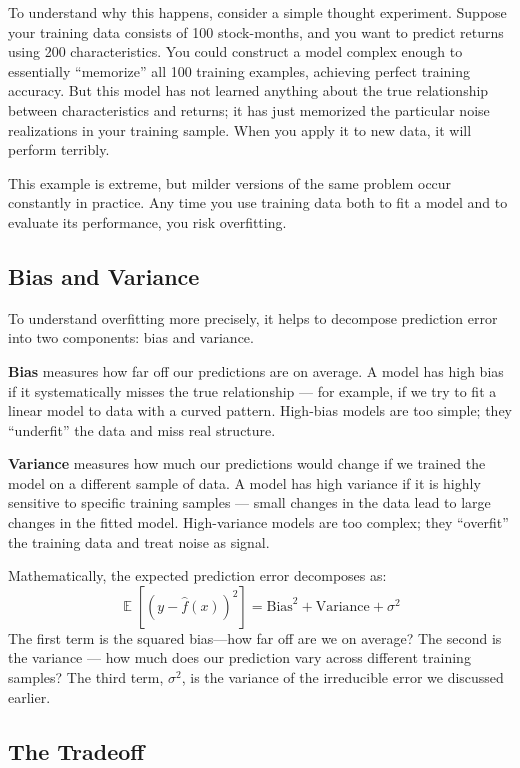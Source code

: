\documentclass[11pt,a4paper]{article}
\DeclareMathOperator{\E}{\mathbb{E}}
\newcommand{\keyword}[1]{\textbf{\textcolor{AccentOrange}{#1}}}
\begin{document}
To understand why this happens, consider a simple thought experiment. Suppose your training data consists of 100 stock-months, and you want to predict returns using 200 characteristics. You could construct a model complex enough to essentially ``memorize'' all 100 training examples, achieving perfect training accuracy. But this model has not learned anything about the true relationship between characteristics and returns; it has just memorized the particular noise realizations in your training sample. When you apply it to new data, it will perform terribly.

This example is extreme, but milder versions of the same problem occur constantly in practice. Any time you use training data both to fit a model and to evaluate its performance, you risk overfitting.

\subsection{Bias and Variance}

To understand overfitting more precisely, it helps to decompose prediction error into two components: bias and variance.

\keyword{Bias} measures how far off our predictions are on average. A model has high bias if it systematically misses the true relationship — for example, if we try to fit a linear model to data with a curved pattern. High-bias models are too simple; they ``underfit'' the data and miss real structure.

\keyword{Variance} measures how much our predictions would change if we trained the model on a different sample of data. A model has high variance if it is highly sensitive to specific training samples — small changes in the data lead to large changes in the fitted model. High-variance models are too complex; they ``overfit'' the training data and treat noise as signal.

Mathematically, the expected prediction error decomposes as:
\[
\E\left[(y - \widehat{f}(x))^2\right] = \text{Bias}^2 + \text{Variance} + \sigma^2
\]
The first term is the squared bias---how far off are we on average? The second is the variance — how much does our prediction vary across different training samples? The third term, $\sigma^2$, is the variance of the irreducible error we discussed earlier. 

\subsection{The Tradeoff}
\end{document}
